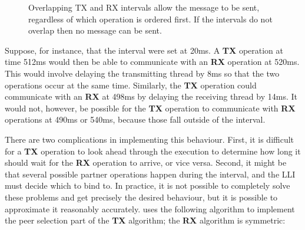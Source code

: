 \begin{figure}
{
    \label{fig:enforce:message_windows:failed}
  }
  \caption{Overlapping TX and RX intervals allow the message to be
    sent, regardless of which operation is ordered first.  If the
    intervals do not overlap then no message can be sent. }
  \label{fig:enforce:message_windows}
\end{figure}

Suppose, for instance, that the interval were set at 20ms.  A
\textbf{TX} operation at time 512ms would then be able to communicate
with an \textbf{RX} operation at 520ms.  This would involve delaying
the transmitting thread by 8ms so that the two operations occur at the
same time.  Similarly, the \textbf{TX} operation could communicate
with an \textbf{RX} at 498ms by delaying the receiving thread by 14ms.
It would not, however, be possible for the \textbf{TX} operation to
communicate with \textbf{RX} operations at 490ms or 540ms, because
those fall outside of the interval.

There are two complications in implementing this behaviour.  First, it
is difficult for a \textbf{TX} operation to look ahead through the
execution to determine how long it should wait for the \textbf{RX}
operation to arrive, or vice versa.  Second, it might be that several
possible partner operations happen during the interval, and the LLI
must decide which to bind to.  In practice, it is not possible to
completely solve these problems and get precisely the desired
behaviour, but it is possible to approximate it reasonably accurately.
{\Implementation} uses the following algorithm to implement the peer
selection part of the \textbf{TX} algorithm; the \textbf{RX} algorithm
is symmetric:

